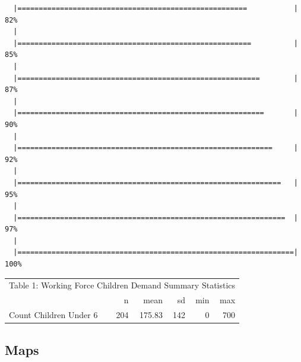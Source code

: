 \documentclass[10pt,letterpaper]{article}
\begin{document}
\begin{verbatim}
  |======================================================           |  82%
  |                                                                       
  |=======================================================          |  85%
  |                                                                       
  |=========================================================        |  87%
  |                                                                       
  |==========================================================       |  90%
  |                                                                       
  |============================================================     |  92%
  |                                                                       
  |==============================================================   |  95%
  |                                                                       
  |===============================================================  |  97%
  |                                                                       
  |=================================================================| 100%
\end{verbatim}

\begin{table}[!h]
\centering\begingroup\fontsize{10}{12}\selectfont

\begin{tabular}{l|r|r|r|r|r}
\hline
\multicolumn{6}{c|}{Table 1: Working Force Children Demand Summary Statistics} \\
\cline{1-6}
  & n & mean & sd & min & max\\
\hline
\rowcolor{gray!6}  Count Children Under 6 & 204 & 175.83 & 142 & 0 & 700\\
\hline
\end{tabular}
\endgroup{}
\end{table}

\subsection{Maps}\label{maps}
\end{document}
